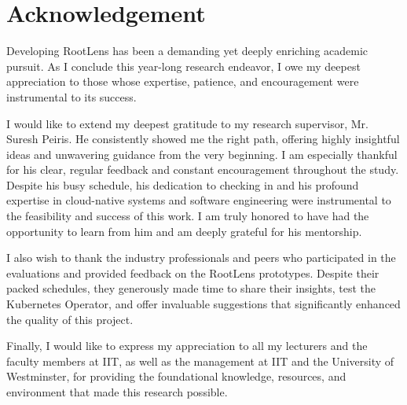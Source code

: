 \chapter*{Acknowledgement}
\setlength{\parindent}{0pt}

Developing RootLens has been a demanding yet deeply enriching academic pursuit. As I conclude this year-long research endeavor, I owe my deepest appreciation to those whose expertise, patience, and encouragement were instrumental to its success.

\vspace{1em}

I would like to extend my deepest gratitude to my research supervisor, Mr. Suresh Peiris. He consistently showed me the right path, offering highly insightful ideas and unwavering guidance from the very beginning. I am especially thankful for his clear, regular feedback and constant encouragement throughout the study. Despite his busy schedule, his dedication to checking in and his profound expertise in cloud-native systems and software engineering were instrumental to the feasibility and success of this work. I am truly honored to have had the opportunity to learn from him and am deeply grateful for his mentorship.

\vspace{1em}

I also wish to thank the industry professionals and peers who participated in the evaluations and provided feedback on the RootLens prototypes. Despite their packed schedules, they generously made time to share their insights, test the Kubernetes Operator, and offer invaluable suggestions that significantly enhanced the quality of this project.

\vspace{1em}

Finally, I would like to express my appreciation to all my lecturers and the faculty members at IIT, as well as the management at IIT and the University of Westminster, for providing the foundational knowledge, resources, and environment that made this research possible.